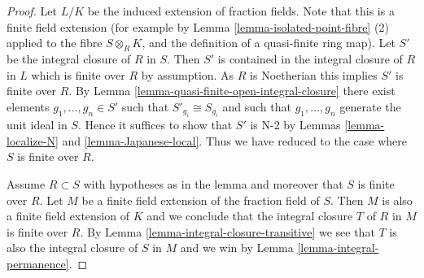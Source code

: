 \documentclass[10pt,a4paper]{amsart}
\theoremstyle{plain}
\theoremstyle{definition}
\theoremstyle{remark}
\numberwithin{equation}{subsection}
\begin{document}
\begin{proof}
Let $L/K$ be the induced extension of fraction fields.
Note that this is a finite field extension (for example by
Lemma \ref{lemma-isolated-point-fibre} (2)
applied to the fibre $S \otimes_R K$, and the definition of a
quasi-finite ring map).
Let $S'$ be the integral closure of $R$ in $S$.
Then $S'$ is contained in the integral closure of $R$ in $L$
which is finite over $R$ by assumption. As $R$ is Noetherian this
implies $S'$ is finite over $R$.
By Lemma \ref{lemma-quasi-finite-open-integral-closure}
there exist elements $g_1, \ldots, g_n \in S'$
such that $S'_{g_i} \cong S_{g_i}$ and such that $g_1, \ldots, g_n$
generate the unit ideal in $S$. Hence it suffices to show that
$S'$ is N-2 by Lemmas \ref{lemma-localize-N} and \ref{lemma-Japanese-local}.
Thus we have reduced to the case where $S$ is finite over $R$.

\medskip\noindent
Assume $R \subset S$ with hypotheses as in the lemma and moreover
that $S$ is finite over $R$. Let $M$ be a finite field extension
of the fraction field of $S$. Then $M$ is also a finite field extension
of $K$ and we conclude that the integral closure $T$ of $R$ in
$M$ is finite over $R$. By Lemma \ref{lemma-integral-closure-transitive}
we see that $T$ is also the integral closure of $S$ in $M$ and we win by
Lemma \ref{lemma-integral-permanence}.
\end{proof}
\end{document}
